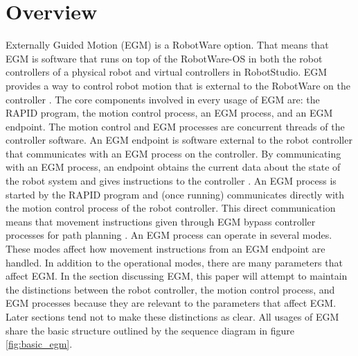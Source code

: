 \documentclass{cslthse-msc}
\begin{document}
\section{Overview}
\label{sec:EGM:Overview}
Externally Guided Motion (EGM) is a RobotWare option. That means that EGM is software that runs on top of the RobotWare-OS in both the robot controllers of a physical robot and virtual controllers in RobotStudio. EGM provides a way to control robot motion that is external to the RobotWare on the controller \cite[Sec. 9.3.1.1]{ABB:controller_software}. The core components involved in every usage of EGM are: the RAPID program, the motion control process, an EGM process, and an EGM endpoint. The motion control and EGM processes are concurrent threads of the controller software. An EGM endpoint is software external to the robot controller that communicates with an EGM process on the controller. By communicating with an EGM process, an endpoint obtains the current data about the state of the robot system and gives instructions to the controller \cite[Sec. 9.3.3]{ABB:controller_software}. An EGM process is started by the RAPID program and (once running) communicates directly with the motion control process of the robot controller. This direct communication means that movement instructions given through EGM bypass controller processes for path planning \cite[Sec. 9.3.1.3]{ABB:controller_software}. An EGM process can operate in several modes. These modes affect how movement instructions from an EGM endpoint are handled. In addition to the operational modes, there are many parameters that affect EGM. In the section discussing EGM, this paper will attempt to maintain the distinctions between the robot controller, the motion control process, and EGM processes because they are relevant to the parameters that affect EGM. Later sections tend not to make these distinctions as clear.  All usages of EGM share the basic structure outlined by the sequence diagram in figure \ref{fig:basic_egm}. 
\end{document}
